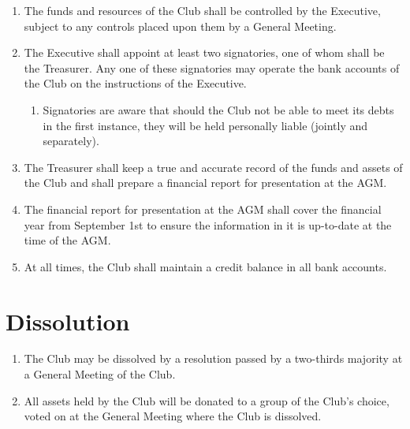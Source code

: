 \documentclass[a4paper]{article}
\begin{document}
	\begin{enumerate}
		\item The funds and resources of the Club shall be controlled by the Executive, subject to any controls placed upon them by a General Meeting.
		
		\item The Executive shall appoint at least two signatories, one of whom shall be the Treasurer.
		Any one of these signatories may operate the bank accounts of the Club on the instructions of the Executive.
		\begin{enumerate}
			\item Signatories are aware that should the Club not be able to meet its debts in the first instance, they will be held personally liable (jointly and separately).
		\end{enumerate}
	
		\item The Treasurer shall keep a true and accurate record of the funds and assets of the Club and shall prepare a financial report for presentation at the \ac{AGM}.
		
		\item The financial report for presentation at the \ac{AGM} shall cover the financial year from September 1st to ensure the information in it is up-to-date at the time of the \ac{AGM}.
		
		\item At all times, the Club shall maintain a credit balance in all bank accounts.

	\end{enumerate}

	\section{Dissolution}
	
	\begin{enumerate}
		\item The Club may be dissolved by a resolution passed by a two-thirds majority at a General Meeting of the Club.
		
		\item All assets held by the Club will be donated to a group of the Club's choice, voted on at the General Meeting where the Club is dissolved.
	\end{enumerate}
	
\end{document}
